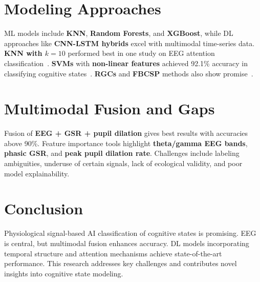\documentclass[12pt]{article}
\begin{document}
\section*{Modeling Approaches}
ML models include \textbf{KNN}, \textbf{Random Forests}, and \textbf{XGBoost}, while DL approaches like \textbf{CNN-LSTM hybrids} excel with multimodal time-series data. \textbf{KNN with $k=10$} performed best in one study on EEG attention classification~\cite{sosa2011classification}. \textbf{SVMs} with \textbf{non-linear features} achieved 92.1\% accuracy in classifying cognitive states~\cite{ahmad2016classification}. \textbf{RGCs} and \textbf{FBCSP} methods also show promise~\cite{appriou2020modern}.

\section*{Multimodal Fusion and Gaps}
Fusion of \textbf{EEG + GSR + pupil dilation} gives best results with accuracies above 90\%. Feature importance tools highlight \textbf{theta/gamma EEG bands}, \textbf{phasic GSR}, and \textbf{peak pupil dilation rate}. Challenges include labeling ambiguities, underuse of certain signals, lack of ecological validity, and poor model explainability.

\section*{Conclusion}
Physiological signal-based AI classification of cognitive states is promising. EEG is central, but multimodal fusion enhances accuracy. DL models incorporating temporal structure and attention mechanisms achieve state-of-the-art performance. This research addresses key challenges and contributes novel insights into cognitive state modeling.



\end{document}
